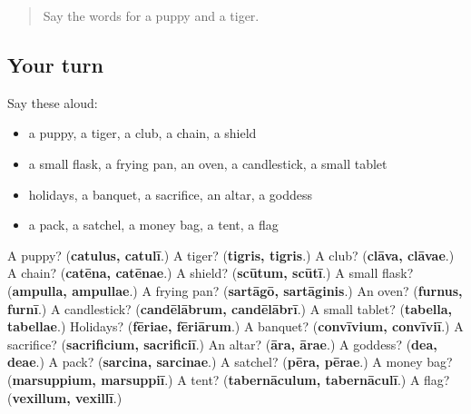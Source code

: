 \label{lesson:LA-R254-second-pass-words-from-chapters-251-254}



\begin{quote}
Say the words for a puppy and a tiger.
\end{quote}

\subsection*{Your turn}
Say these aloud:

\begin{itemize}
\raggedright
  \item a puppy, a tiger, a club, a chain, a shield
  \item a small flask, a frying pan, an oven, a candlestick, a small tablet
  \item holidays, a banquet, a sacrifice, an altar, a goddess
  \item a pack, a satchel, a money bag, a tent, a flag
\end{itemize}

\begin{tcolorbox}[breakable,colback=teal!4,colframe=teal!35!black,title={Before you move on}]
A puppy? (\textbf{catulus, catulī}.) A tiger? (\textbf{tigris, tigris}.) A club? (\textbf{clāva, clāvae}.) A chain? (\textbf{catēna, catēnae}.) A shield? (\textbf{scūtum, scūtī}.) A small flask? (\textbf{ampulla, ampullae}.) A frying pan? (\textbf{sartāgō, sartāginis}.) An oven? (\textbf{furnus, furnī}.) A candlestick? (\textbf{candēlābrum, candēlābrī}.) A small tablet? (\textbf{tabella, tabellae}.) Holidays? (\textbf{fēriae, fēriārum}.) A banquet? (\textbf{convīvium, convīviī}.) A sacrifice? (\textbf{sacrificium, sacrificiī}.) An altar? (\textbf{āra, ārae}.) A goddess? (\textbf{dea, deae}.) A pack? (\textbf{sarcina, sarcinae}.) A satchel? (\textbf{pēra, pērae}.) A money bag? (\textbf{marsuppium, marsuppiī}.) A tent? (\textbf{tabernāculum, tabernāculī}.) A flag? (\textbf{vexillum, vexillī}.)
\end{tcolorbox}
